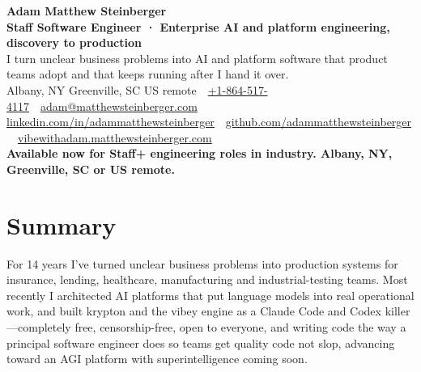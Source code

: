 \documentclass[10pt,letterpaper]{article}
\newcommand{\szname}{\fontsize{20pt}{24pt}\selectfont}
\newcommand{\sztitle}{\fontsize{10.5pt}{13pt}\selectfont}
\newcommand{\szbody}{\fontsize{9pt}{10.8pt}\selectfont}
\newcommand{\szmeta}{\fontsize{8pt}{10pt}\selectfont}
\begin{document}
\color{ink}\szbody

\begin{center}
{\szname\bfseries\color{primary} Adam Matthew Steinberger}\\[3pt]
{\sztitle\bfseries\color{accent} Staff Software Engineer · Enterprise AI and platform engineering, discovery to production}\\[4pt]
{\szbody I turn unclear business problems into AI and platform software that product teams adopt and that keeps running after I hand it over.}\\[6pt]
{\szmeta\color{muted} Albany, NY \textbullet{} Greenville, SC \textbullet{} US remote\ {\color{rulecolor}\textbar}\ \href{tel:+18645174117}{+1-864-517-4117}\ {\color{rulecolor}\textbar}\ \href{mailto:adam@matthewsteinberger.com}{adam@matthewsteinberger.com}}\\[2pt]
{\szmeta\color{muted} \href{https://www.linkedin.com/in/adammatthewsteinberger/}{linkedin.com/in/adammatthewsteinberger}\ {\color{rulecolor}\textbar}\ \href{https://github.com/adammatthewsteinberger}{github.com/adammatthewsteinberger}\ {\color{rulecolor}\textbar}\ \href{https://vibewithadam.matthewsteinberger.com}{vibewithadam.matthewsteinberger.com}}\\[6pt]
{\szbody\bfseries Available now for Staff+ engineering roles in industry. Albany, NY, Greenville, SC or US remote.}
\end{center}
\vspace{-6pt}
\section*{Summary}
For 14 years I've turned unclear business problems into production systems for insurance, lending, healthcare, manufacturing and industrial-testing teams. Most recently I architected AI platforms that put language models into real operational work, and built krypton and the vibey engine as a Claude Code and Codex killer—completely free, censorship-free, open to everyone, and writing code the way a principal software engineer does so teams get quality code not slop, advancing toward an AGI platform with superintelligence coming soon.\par
\end{document}
